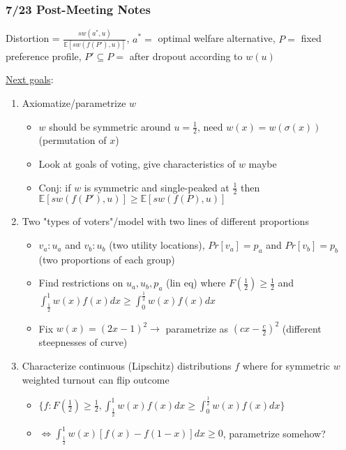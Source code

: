 \documentclass[12pt]{article}
\begin{document}
\subsubsection*{7/23 Post-Meeting Notes}

Distortion = $\frac{sw(a^*, u)}{\mathbb{E}[sw(f(P'), u)]}$, $a^* =$ optimal welfare alternative, $P =$ fixed preference profile, $P' \subseteq P =$ after dropout according to $w(u)$

\underline{Next goals}:
\begin{enumerate}[nolistsep]
    \item Axiomatize/parametrize $w$
    \begin{itemize}[nolistsep]
        \item $w$ should be symmetric around $u = \frac{1}{2}$, need $w(x) = w(\sigma(x))$ (permutation of $x$)
        \item Look at goals of voting, give characteristics of $w$ maybe
        \item Conj: if $w$ is symmetric and single-peaked at $\frac{1}{2}$ then $\mathbb{E}[sw(f(P'), u)] \geq \mathbb{E}[sw(f(P), u)]$
    \end{itemize}
    \item Two "types of voters"/model with two lines of different proportions
    \begin{itemize}[nolistsep]
        \item $v_a : u_a$ and $v_b : u_b$ (two utility locations), $Pr[v_a] = p_a$ and $Pr[v_b] = p_b$ (two proportions of each group)
        \item Find restrictions on $u_a, u_b, p_a$ (lin eq) where $F(\frac{1}{2}) \geq \frac{1}{2}$ and $\int_\frac{1}{2}^1w(x)f(x)dx \geq \int_0^\frac{1}{2}w(x)f(x)dx$
        \item Fix $w(x) = (2x-1)^2 \rightarrow$ parametrize as $(cx-\frac{c}{2})^2$ (different steepnesses of curve)
    \end{itemize}
    \item Characterize continuous (Lipschitz) distributions $f$ where for symmetric $w$ weighted turnout can flip outcome
    \begin{itemize}[nolistsep]
        \item $\{f: F(\frac{1}{2}) \geq \frac{1}{2}, \int_\frac{1}{2}^1w(x)f(x)dx \geq \int_0^\frac{1}{2}w(x)f(x)dx\}$
        \item $\iff \int_\frac{1}{2}^1w(x)[f(x)-f(1-x)]dx \geq 0$, parametrize somehow?
    \end{itemize}
\end{enumerate}
\end{document}

